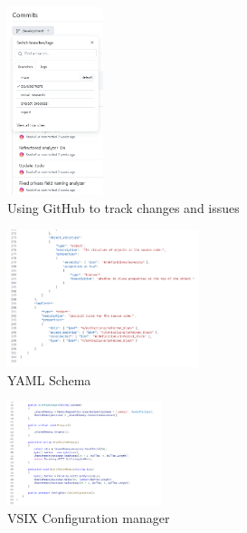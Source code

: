 \begin{figure}
    \centering
    \caption{Using GitHub to track changes and issues}
    \label{fig:GitCommitHistory}
    \includegraphics[width=0.25\textwidth]{Figures/GitHubCommitHistoryCropped.png}
\end{figure}

\begin{figure}
    \centering
    \caption{YAML Schema}
    \label{fig:YAMLSchema}
    \includegraphics[width=0.5\textwidth]{Figures/YAMLSchemaCropped.png}
\end{figure}

\begin{figure}
    \centering
    \caption{VSIX Configuration manager}
    \label{fig:VSIXConfigurationManager}
    \includegraphics[width=0.4\textwidth]{Figures/VSIXAConfigManagerCropped.png}
\end{figure}

